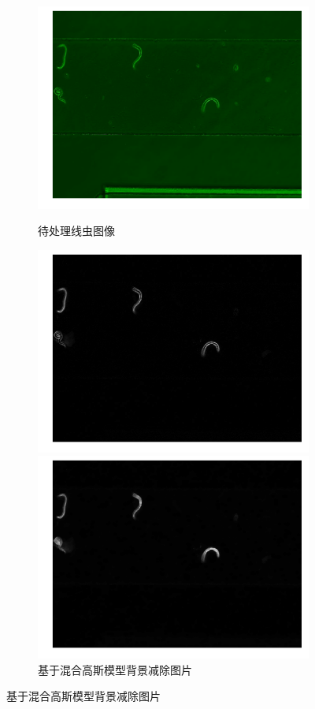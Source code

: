 \begin{figure}[h]
  \centering
  \begin{subfigure}{0.4\textwidth}
    \centering
    \includegraphics[width=1\linewidth]{figure/chap3/worm.png}
    \caption{待处理线虫图像}
	\includegraphics[width=1\linewidth]{figure/chap3/bgsub.png}
	\caption{基于混合高斯模型背景减除图片}
	\includegraphics[width=1\linewidth]{figure/chap3/close.png}

\end{subfigure}
\end{figure}
